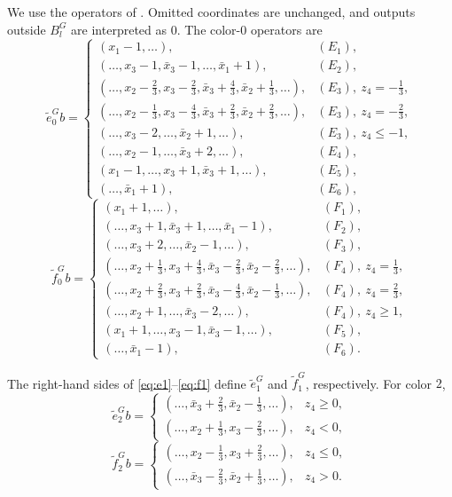 \documentclass[11pt,reqno]{amsart}
\numberwithin{table}{section}
\numberwithin{equation}{section}
\theoremstyle{plain}
\theoremstyle{definition}
\begin{document}
We use the operators of \cite[Section~3, Proposition~1]{MMO}.
Omitted coordinates are unchanged, and outputs outside \(B_l^G\)
are interpreted as \(0\).
The color-\(0\) operators are
\begin{equation}\label{eq:G-e0}
	\widetilde e_0^G b
	=
	\begin{cases}
		(x_1-1,\ldots),
		&(E_1),\\
		(\ldots,x_3-1,\bar x_3-1,\ldots,\bar x_1+1),
		&(E_2),\\
		(\ldots,x_2-\tfrac23,x_3-\tfrac23,
		\bar x_3+\tfrac43,\bar x_2+\tfrac13,\ldots),
		&(E_3),\ z_4=-\tfrac13,\\
		(\ldots,x_2-\tfrac13,x_3-\tfrac43,
		\bar x_3+\tfrac23,\bar x_2+\tfrac23,\ldots),
		&(E_3),\ z_4=-\tfrac23,\\
		(\ldots,x_3-2,\ldots,\bar x_2+1,\ldots),
		&(E_3),\ z_4\le-1,\\
		(\ldots,x_2-1,\ldots,\bar x_3+2,\ldots),
		&(E_4),\\
		(x_1-1,\ldots,x_3+1,\bar x_3+1,\ldots),
		&(E_5),\\
		(\ldots,\bar x_1+1),
		&(E_6),
	\end{cases}
\end{equation}
\begin{equation}\label{eq:G-f0}
	\widetilde f_0^G b
	=
	\begin{cases}
		(x_1+1,\ldots),
		&(F_1),\\
		(\ldots,x_3+1,\bar x_3+1,\ldots,\bar x_1-1),
		&(F_2),\\
		(\ldots,x_3+2,\ldots,\bar x_2-1,\ldots),
		&(F_3),\\
		(\ldots,x_2+\tfrac13,x_3+\tfrac43,
		\bar x_3-\tfrac23,\bar x_2-\tfrac23,\ldots),
		&(F_4),\ z_4=\tfrac13,\\
		(\ldots,x_2+\tfrac23,x_3+\tfrac23,
		\bar x_3-\tfrac43,\bar x_2-\tfrac13,\ldots),
		&(F_4),\ z_4=\tfrac23,\\
		(\ldots,x_2+1,\ldots,\bar x_3-2,\ldots),
		&(F_4),\ z_4\ge1,\\
		(x_1+1,\ldots,x_3-1,\bar x_3-1,\ldots),
		&(F_5),\\
		(\ldots,\bar x_1-1),
		&(F_6).
	\end{cases}
\end{equation}

The right-hand sides of \eqref{eq:e1}--\eqref{eq:f1} define
\(\widetilde e_1^G\) and \(\widetilde f_1^G\), respectively.
For color \(2\),
\begin{equation}\label{eq:G-e2}
	\widetilde e_2^G b
	=
	\begin{cases}
		(\ldots,\bar x_3+\tfrac23,\bar x_2-\tfrac13,\ldots),
		&z_4\ge0,\\
		(\ldots,x_2+\tfrac13,x_3-\tfrac23,\ldots),
		&z_4<0,
	\end{cases}
\end{equation}
\begin{equation}\label{eq:G-f2}
	\widetilde f_2^G b
	=
	\begin{cases}
		(\ldots,x_2-\tfrac13,x_3+\tfrac23,\ldots),
		&z_4\le0,\\
		(\ldots,\bar x_3-\tfrac23,\bar x_2+\tfrac13,\ldots),
		&z_4>0.
	\end{cases}
\end{equation}
\end{document}
